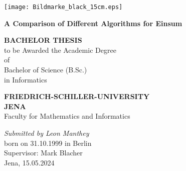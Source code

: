 \documentclass[12pt]{report}
\begin{document}
\begin{titlepage}
    \begin{center}
    
    \begin{spacing}{1.5}
        \texttt{[image: Bildmarke\_black\_15cm.eps]}
        \vspace*{\fill}
    \end{spacing}
    \begin{spacing}{2.5}
        \textbf{\huge A Comparison of Different Algorithms for Einsum}\\[0.5cm]
        \vspace*{\fill}
        \begin{spacing}{1.5}
            \textbf{BACHELOR THESIS\\}
            to be Awarded the Academic Degree\\
            of\\
            Bachelor of Science (B.Sc.)\\
            in Informatics\\
        \end{spacing}
    \end{spacing}

    \vspace*{\fill}

    \begin{spacing}{1.15}
    \textbf{FRIEDRICH-SCHILLER-UNIVERSITY\\JENA\\}
    Faculty for Mathematics and Informatics
    
    \vspace*{\fill}
    
    \textit{Submitted by Leon Manthey}\\
    born on 31.10.1999 in Berlin\\
    Supervisor: Mark Blacher\\
    Jena, 15.05.2024
    
    \end{spacing}
    \end{center}
    \end{titlepage}
\end{document}
